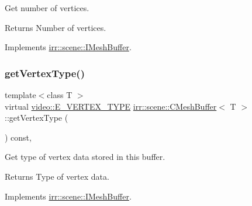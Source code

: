 Get number of vertices. 

\begin{DoxyReturn}{Returns}
Number of vertices. 
\end{DoxyReturn}


Implements \hyperlink{classirr_1_1scene_1_1IMeshBuffer_a77ab285c8c886af8ddeb0371db7bde96}{irr\+::scene\+::\+I\+Mesh\+Buffer}.

\mbox{\label{classirr_1_1scene_1_1CMeshBuffer_a341db661218a49d8d8fd12550700cb67}} 
\subsubsection{\texorpdfstring{get\+Vertex\+Type()}{getVertexType()}\hspace{0.1cm}{\footnotesize\ttfamily [1/2]}}
{\footnotesize\ttfamily template$<$class T $>$ \\
virtual \hyperlink{namespaceirr_1_1video_a0e3b59e025e0d0db0ed2ee0ce904deac}{video\+::\+E\+\_\+\+V\+E\+R\+T\+E\+X\+\_\+\+T\+Y\+PE} \hyperlink{classirr_1_1scene_1_1CMeshBuffer}{irr\+::scene\+::\+C\+Mesh\+Buffer}$<$ T $>$\+::get\+Vertex\+Type (\begin{DoxyParamCaption}{ }\end{DoxyParamCaption}) const\hspace{0.3cm}{\ttfamily [inline]}, {\ttfamily [virtual]}}



Get type of vertex data stored in this buffer. 

\begin{DoxyReturn}{Returns}
Type of vertex data. 
\end{DoxyReturn}


Implements \hyperlink{classirr_1_1scene_1_1IMeshBuffer_a4d7a84ae4416487736f0ed0f519bb4f0}{irr\+::scene\+::\+I\+Mesh\+Buffer}.

\mbox{\label{classirr_1_1scene_1_1CMeshBuffer_a341db661218a49d8d8fd12550700cb67}} 

